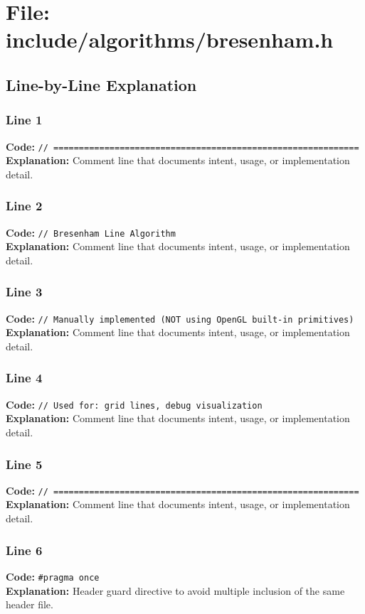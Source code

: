 \documentclass[11pt,a4paper]{article}
\begin{document}
\newpage
\section{File: include/algorithms/bresenham.h}
\subsection{Line-by-Line Explanation}
\subsubsection*{Line 1}
\textbf{Code:} \verb|// ============================================================|\\
\textbf{Explanation:} Comment line that documents intent, usage, or implementation detail.

\subsubsection*{Line 2}
\textbf{Code:} \verb|// Bresenham Line Algorithm|\\
\textbf{Explanation:} Comment line that documents intent, usage, or implementation detail.

\subsubsection*{Line 3}
\textbf{Code:} \verb|// Manually implemented (NOT using OpenGL built-in primitives)|\\
\textbf{Explanation:} Comment line that documents intent, usage, or implementation detail.

\subsubsection*{Line 4}
\textbf{Code:} \verb|// Used for: grid lines, debug visualization|\\
\textbf{Explanation:} Comment line that documents intent, usage, or implementation detail.

\subsubsection*{Line 5}
\textbf{Code:} \verb|// ============================================================|\\
\textbf{Explanation:} Comment line that documents intent, usage, or implementation detail.

\subsubsection*{Line 6}
\textbf{Code:} \verb|#pragma once|\\
\textbf{Explanation:} Header guard directive to avoid multiple inclusion of the same header file.
\end{document}
